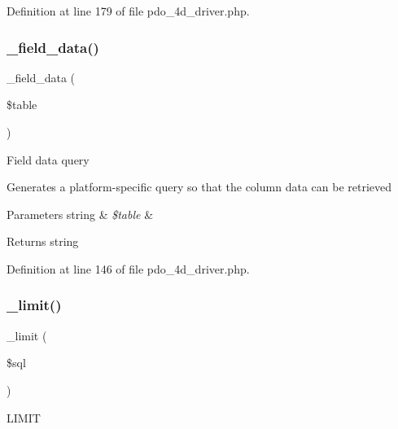 Definition at line 179 of file pdo\+\_\+4d\+\_\+driver.\+php.

\mbox{\label{class_c_i___d_b__pdo__4d__driver_a95247d9671893adc3444cb184ad32ea1}} 
\subsubsection{\texorpdfstring{\_field\_data()}{\_field\_data()}}
{\footnotesize\ttfamily \+\_\+field\+\_\+data (\begin{DoxyParamCaption}\item[{}]{\$table }\end{DoxyParamCaption})\hspace{0.3cm}{\ttfamily [protected]}}

Field data query

Generates a platform-\/specific query so that the column data can be retrieved


\begin{DoxyParams}[1]{Parameters}
string & {\em \$table} & \\
\hline
\end{DoxyParams}
\begin{DoxyReturn}{Returns}
string 
\end{DoxyReturn}


Definition at line 146 of file pdo\+\_\+4d\+\_\+driver.\+php.

\mbox{\label{class_c_i___d_b__pdo__4d__driver_a3a02ea06541b8ecc25a33a61651562c8}} 
\subsubsection{\texorpdfstring{\_limit()}{\_limit()}}
{\footnotesize\ttfamily \+\_\+limit (\begin{DoxyParamCaption}\item[{}]{\$sql }\end{DoxyParamCaption})\hspace{0.3cm}{\ttfamily [protected]}}

L\+I\+M\+IT

